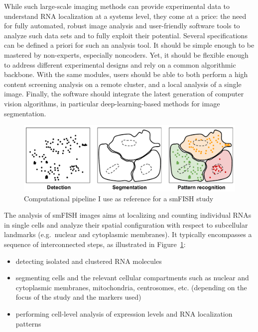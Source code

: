 While such large-scale imaging methods can provide experimental data to understand \ac{RNA} localization at a systems level, they come at a price: the need for fully automated, robust image analysis and user-friendly software tools to analyze such data sets and to fully exploit their potential.
Several specifications can be defined a priori for such an analysis tool.
It should be simple enough to be mastered by non-experts, especially noncoders.
Yet, it should be flexible enough to address different experimental designs and rely on a common algorithmic backbone.
With the same modules, users should be able to both perform a high content screening analysis on a remote cluster, and a local analysis of a single image.
Finally, the software should integrate the latest generation of computer vision algorithms, in particular deep-learning-based methods for image segmentation.

\begin{figure}[h]
    \centering
    \includegraphics[width=\textwidth]{figures/chapter1/schema_pipeline}
    \caption{Computational pipeline I use as reference for a smFISH study}
    \label{fig:pipeline}
\end{figure}

The analysis of \ac{smFISH} images aims at localizing and counting individual \ac{RNA}s in single cells and analyze their spatial configuration with respect to subcellular landmarks (e.g.~nuclear and cytoplasmic membranes).
It typically encompasses a sequence of interconnected steps, as illustrated in Figure~\ref{fig:pipeline}:
\begin{itemize}
	\setlength\itemsep{0.1em}
	\item detecting isolated and clustered \ac{RNA} molecules
	\item segmenting cells and the relevant cellular compartments such as nuclear and cytoplasmic membranes, mitochondria, centrosomes, etc. (depending on the focus of the study and the markers used)
	\item performing cell-level analysis of expression levels and \ac{RNA} localization patterns
\end{itemize}

